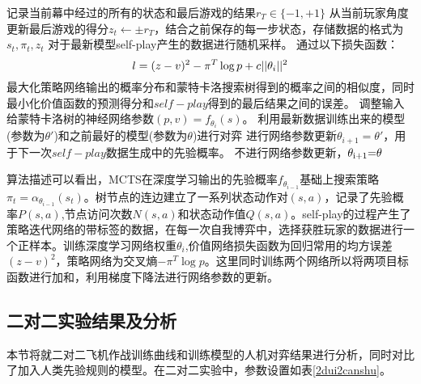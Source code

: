 		\begin{algorithm}[htbp]
		\begin{algorithmic}[1]
		\State 记录当前幕中经过的所有的状态和最后游戏的结果${r_T} \in \{  - 1, + 1\} $
		\State 从当前玩家角度更新最后游戏的得分${z_t} \leftarrow  \pm {r_T}$，结合之前保存的每一步状态，存储数据的格式为$s_t,\pi_t,z_t$
		\EndFor
		\State 对于最新模型self-play产生的数据进行随机采样。
		\State 通过以下损失函数：
		\begin{equation}
		l = {(z - v)^2} - {\pi ^T}\log p + c||{\theta _i}{\rm{|}}{{\rm{|}}^{\rm{2}}}
		\end{equation}
		最大化策略网络输出的概率分布和蒙特卡洛搜索树得到的概率之间的相似度，同时最小化价值函数的预测得分和$self-play$得到的最后结果之间的误差。
		调整输入给蒙特卡洛树的神经网络参数$(p,v) = {f_{{\theta _i}}}(s)$。
		\State 利用最新数据训练出来的模型(参数为$\theta '$)和之前最好的模型(参数为$\theta$)进行对弈
		 \State 进行网络参数更新${\theta _{i + 1}} = \theta '$，用于下一次$self-play$数据生成中的先验概率。
		\Else
		 \State 不进行网络参数更新，${\theta _{{\rm{i + 1}}}}{\rm{ = }}\theta $
		\EndIf
		\EndIf
		\EndFor
	\end{algorithmic}
\end{algorithm}

算法描述可以看出，MCTS在深度学习输出的先验概率${f_{{\theta _{i - 1}}}}$基础上搜索策略${\pi _t} = {\alpha _{{\theta _{i - 1}}}}({s_t})$。树节点的连边建立了一系列状态动作对$(s,a)$，记录了先验概率$P(s,a)$,节点访问次数$N(s,a)$和状态动作值$Q(s,a)$。self-play的过程产生了策略迭代网络的带标签的数据，在每一次自我博弈中，选择获胜玩家的数据进行一个正样本。训练深度学习网络权重${\theta _i}$,价值网络损失函数为回归常用的均方误差${(z - v)^2}$，策略网络为交叉熵$ - {\pi ^T}\log p$。这里同时训练两个网络所以将两项目标函数进行加和，利用梯度下降法进行网络参数的更新。

\subsection{二对二实验结果及分析}
本节将就二对二飞机作战训练曲线和训练模型的人机对弈结果进行分析，同时对比了加入人类先验规则的模型。在二对二实验中，参数设置如表\ref{2dui2canshu}。

